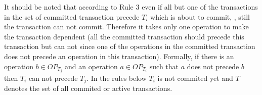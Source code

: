 \documentclass[a4paper, 11pt]{article}
\begin{document}
It should be noted that according to Rule 3 even if all but one of the transactions in the set of committed transaction precede $T_i$ which is about to commit, , still the transaction can not commit. Therefore it takes only one operation to make the transaction dependent (all the committed transaction should precede this transaction but can not since one of the operations in the committed transaction does not precede an operation in this transaction). Formally, if there is an operation $b \in OP_{T_j}$ and an operation $a \in OP_{T_i}$ such that $a$ does not precede $b$ then $T_i$ can not precede $T_j$. In the rules below $T_i$ is not commited yet and $T$ denotes the set of all commited or active transactions. \\








\end{document}
